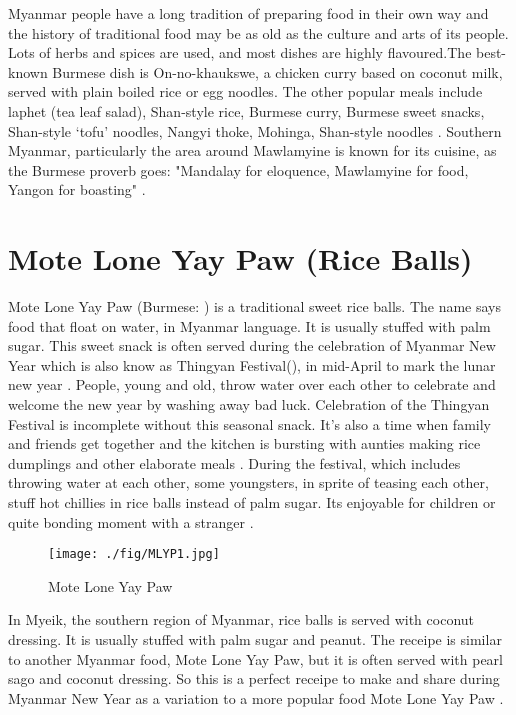 \documentclass[conference]{IEEEtran}
\begin{document}
Myanmar people have a long tradition of preparing food in their own way and the history of traditional food may be as old as the culture and arts of its people. Lots of herbs and spices are used, and most dishes are highly flavoured.The best-known Burmese dish is On-no-khaukswe, a chicken curry based on coconut milk, served with plain boiled rice or egg noodles. The other popular meals include laphet (tea leaf salad), Shan-style rice, Burmese curry, Burmese sweet snacks, Shan-style ‘tofu’ noodles, Nangyi thoke, Mohinga, Shan-style noodles \cite{b1}. Southern Myanmar, particularly the area around Mawlamyine is known for its cuisine, as the Burmese proverb goes: "Mandalay for eloquence, Mawlamyine for food, Yangon for boasting"  \cite{b2}.
	
\section{Mote Lone Yay Paw (Rice Balls)}
\label{sec:MoteLoneYayPaw}
Mote Lone Yay Paw (Burmese: ) is a traditional sweet rice balls. The name says food that float on water, in Myanmar language. It is usually stuffed with palm sugar. This sweet snack is often served during the celebration of Myanmar New Year which is also know as Thingyan Festival(), in mid-April to mark the lunar new year \cite{b3}. People, young and old, throw water over each other to celebrate and welcome the new year by washing away bad luck. Celebration of the Thingyan Festival is incomplete without this seasonal snack. It’s also a time when family and friends get together and the kitchen is bursting with aunties making rice dumplings and other elaborate meals \cite{b4}. During the festival, which includes throwing water at each other, some youngsters, in sprite of teasing each other, stuff hot chillies in rice balls instead of palm sugar. Its enjoyable for children or quite bonding moment with a stranger \cite{b3}.

\begin{figure}[ht!]
  \centering
\texttt{[image: ./fig/MLYP1.jpg]}
  \caption{Mote Lone Yay Paw}
\label{fig:MLYPFig1}
\end{figure}
 
In Myeik, the southern region of Myanmar, rice balls is served with coconut dressing. It is usually stuffed with palm sugar and peanut. The receipe is similar to another Myanmar food, Mote Lone Yay Paw, but it is often served with pearl sago and coconut dressing. So this is a perfect receipe to make and share during Myanmar New Year as a variation to a more popular food Mote Lone Yay Paw \cite{b3}.
\end{document}
